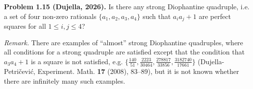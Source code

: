 \textbf{Problem 1.15 (Dujella, 2026).} Is there any strong Diophantine quadruple, i.e. a set of four non-zero rationals $\{a_1,a_2,a_3,a_4\}$ such that $a_ia_j+1$ are perfect squares for all $1 \leqslant i,j \leqslant 4$?

\medskip

\textit{Remark.} There are examples of ``almost'' strong Diophantine quadruples, where all conditions for a strong quadruple are satisfied except that the condition that $a_3a_4+1$ is a square is not satisfied, e.g. $\{\frac{140}{51}, \frac{2223}{30464}, \frac{278817}{33856}, \frac{3182740}{17661}\}$ (Dujella-Petričević, Experiment. Math. \textbf{17} (2008), 83--89), but it is not known whether there are infinitely many such examples.
